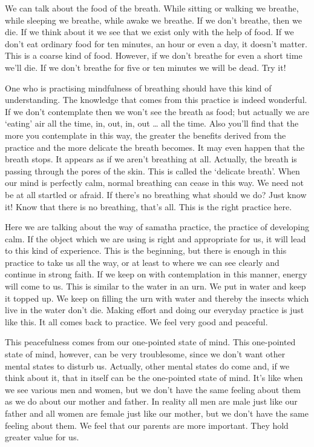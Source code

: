 We can talk about the food of the breath. While sitting or walking we breathe, while sleeping we breathe, while awake we breathe. If we don't breathe, then we die. If we think about it we see that we exist only with the help of food. If we don't eat ordinary food for ten minutes, an hour or even a day, it doesn't matter. This is a coarse kind of food. However, if we don't breathe for even a short time we'll die. If we don't breathe for five or ten minutes we will be dead. Try it! 

One who is practising mindfulness of breathing should have this kind of understanding. The knowledge that comes from this practice is indeed wonderful. If we don't contemplate then we won't see the breath as food; but actually we are `eating' air all the time, in, out, in, out \ldots{} all the time. Also you'll find that the more you contemplate in this way, the greater the benefits derived from the practice and the more delicate the breath becomes. It may even happen that the breath stops. It appears as if we aren't breathing at all. Actually, the breath is passing through the pores of the skin. This is called the `delicate breath'. When our mind is perfectly calm, normal breathing can cease in this way. We need not be at all startled or afraid. If there's no breathing what should we do? Just know it! Know that there is no breathing, that's all. This is the right practice here. 

Here we are talking about the way of samatha practice, the practice of developing calm. If the object which we are using is right and appropriate for us, it will lead to this kind of experience. This is the beginning, but there is enough in this practice to take us all the way, or at least to where we can see clearly and continue in strong faith. If we keep on with contemplation in this manner, energy will come to us. This is similar to the water in an urn. We put in water and keep it topped up. We keep on filling the urn with water and thereby the insects which live in the water don't die. Making effort and doing our everyday practice is just like this. It all comes back to practice. We feel very good and peaceful. 

This peacefulness comes from our one-pointed state of mind. This one-pointed state of mind, however, can be very troublesome, since we don't want other mental states to disturb us. Actually, other mental states do come and, if we think about it, that in itself can be the one-pointed state of mind. It's like when we see various men and women, but we don't have the same feeling about them as we do about our mother and father. In reality all men are male just like our father and all women are female just like our mother, but we don't have the same feeling about them. We feel that our parents are more important. They hold greater value for us. 

